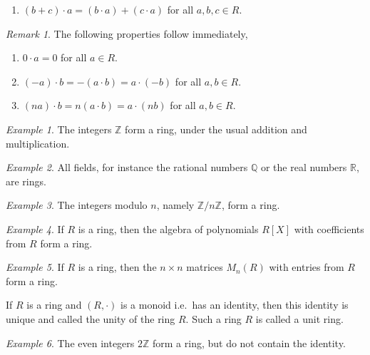 \documentclass[11pt]{article}
\newcommand{\R}{\mathbb{R}}
\newcommand{\Q}{\mathbb{Q}}
\newcommand{\Z}{\mathbb{Z}}
\theoremstyle{definition}
\theoremstyle{remark}
\newtheorem*{remark}{Remark}
\newtheorem*{example}{Example}
\numberwithin{equation}{section}
\begin{document}
\begin{definition}
\begin{enumerate}
\begin{enumerate}
                \item $(b + c)\cdot a = (b\cdot a) + (c\cdot a)$ for all $a, b, c \in R$.
            \end{enumerate}
        \end{enumerate}
        \begin{remark}
            The following properties follow immediately,
            \begin{enumerate}
                \itemsep0em
                \item $0\cdot a = 0$ for all $a \in R$.
                \item $(-a)\cdot b = -(a\cdot b) = a\cdot(-b)$ for all $a, b \in R$.
                \item $(na)\cdot b = n(a\cdot b) = a\cdot (nb)$ for all $a, b \in R$.
            \end{enumerate}
        \end{remark}
    \end{definition}

    \begin{example}
        The integers $\Z$ form a ring, under the usual addition and multiplication.
    \end{example}
    \begin{example}
        All fields, for instance the rational numbers $\Q$ or the real numbers $\R$,
        are rings.
    \end{example}
    \begin{example}
        The integers modulo $n$, namely $\Z/n\Z$, form a ring.
    \end{example}
    \begin{example}
        If $R$ is a ring, then the algebra of polynomials $R[X]$ with coefficients
        from $R$ form a ring.
    \end{example}
    \begin{example}
        If $R$ is a ring, then the $n \times n$ matrices $M_n(R)$ with entries from
        $R$ form a ring.
    \end{example}

    \begin{definition}
        If $R$ is a ring and $(R, \cdot)$ is a monoid i.e.\ has an identity, then
        this identity is unique and called the unity of the ring $R$. Such a ring $R$
        is called a unit ring.
    \end{definition}
    \begin{example}
        The even integers $2\Z$ form a ring, but do not contain the identity.
    \end{example}
\end{document}
